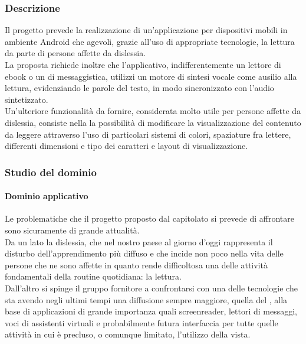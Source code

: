 		\subsubsection{Descrizione}
		Il progetto prevede la realizzazione di un'applicazione per dispositivi mobili in ambiente Android che agevoli, grazie all'uso di appropriate tecnologie, 
		la lettura da parte di persone affette da dislessia.
		\\La proposta richiede inoltre che l'applicativo, indifferentemente un lettore di ebook o un  di messaggistica, utilizzi un motore di sintesi 
		vocale come ausilio alla lettura, evidenziando le parole del testo, in modo sincronizzato con l'audio sintetizzato. 
		\\Un'ulteriore funzionalità da fornire, considerata molto utile per persone affette da dislessia, consiste nella la possibilità di 
		modificare la visualizzazione del contenuto da leggere attraverso l'uso di particolari sistemi di colori, spaziature fra lettere, differenti dimensioni 
		e tipo dei caratteri e layout di visualizzazione.
		\subsubsection{Studio del dominio}
			\paragraph{Dominio applicativo}
			Le problematiche che il progetto proposto dal capitolato si prevede di affrontare sono sicuramente di grande attualità.
			\\Da un lato la dislessia, che nel nostro paese al giorno d'oggi rappresenta il disturbo dell'apprendimento più diffuso e che incide non poco nella 
			vita delle persone che ne sono affette in quanto rende difficoltosa una delle attività fondamentali della routine quotidiana: la lettura. 
			\\Dall'altro si spinge il gruppo fornitore a confrontarsi con una delle tecnologie che sta avendo negli ultimi tempi una diffusione sempre 
			maggiore, quella del , alla base di applicazioni di grande importanza quali screenreader, lettori di messaggi, voci di 
			assistenti virtuali e probabilmente futura interfaccia per tutte quelle attività in cui è precluso, o comunque limitato, l'utilizzo della vista.
